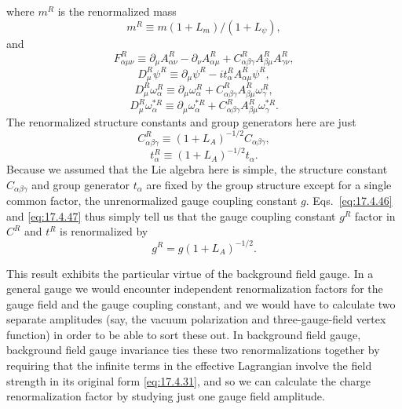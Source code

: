 where $m^R$ is the renormalized mass
\begin{equation}
m^R\equiv m(1+L_m)/(1+L_\psi),
\label{eq:17.4.41}
\end{equation}
and
\begin{equation}
F_{\alpha\mu\nu}^R\equiv
\partial_\mu A_{\alpha\nu}^R-\partial_\nu A_{\alpha\mu}^R
+C_{\alpha\beta\gamma}^R A_{\beta\mu}^R A_{\gamma\nu}^R,
\label{eq:17.4.42}
\end{equation}
\begin{equation}
D_\mu^R\psi^R\equiv
\partial_\mu\psi^R-it_\alpha^R A_{\alpha\mu}^R\psi^R,
\label{eq:17.4.43}
\end{equation}
\begin{equation}
D_\mu^R\omega_\alpha^R\equiv
\partial_\mu\omega_\alpha^R
+C_{\alpha\beta\gamma}^R A_{\beta\mu}^R\omega_\gamma^R,
\label{eq:17.4.44}
\end{equation}
\begin{equation}
D_\mu^R\omega_\alpha^{*R}\equiv
\partial_\mu\omega_\alpha^{*R}
+C_{\alpha\beta\gamma}^R A_{\beta\mu}^R\omega_\gamma^{*R}.
\label{eq:17.4.45}
\end{equation}
The renormalized structure constants and group generators here are just
\begin{equation}
C_{\alpha\beta\gamma}^R\equiv
(1+L_A)^{-1/2}C_{\alpha\beta\gamma},
\label{eq:17.4.46}
\end{equation}
\begin{equation}
t_\alpha^R\equiv(1+L_A)^{-1/2}t_\alpha.
\label{eq:17.4.47}
\end{equation}
Because we assumed that the Lie algebra here is simple, the structure
constant $C_{\alpha\beta\gamma}$ and group generator $t_\alpha$ are fixed by
the group structure except for a single common factor, the unrenormalized
gauge coupling constant $g$. Eqs.~\eqref{eq:17.4.46} and
\eqref{eq:17.4.47} thus simply tell us that the gauge coupling constant
$g^R$ factor in $C^R$ and $t^R$ is renormalized by
\begin{equation}
g^R=g(1+L_A)^{-1/2}.
\label{eq:17.4.48}
\end{equation}

This result exhibits the particular virtue of the background field gauge.
In a general gauge we would encounter independent renormalization factors
for the gauge field and the gauge coupling constant, and we would have to
calculate two separate amplitudes (say, the vacuum polarization and
three-gauge-field vertex function) in order to be able to sort these out.
In background field gauge, background field gauge invariance ties these two
renormalizations together by requiring that the infinite terms in the
effective Lagrangian involve the field strength in its original form
\eqref{eq:17.4.31}, and so we can calculate the charge renormalization factor
by studying just one gauge field amplitude.
